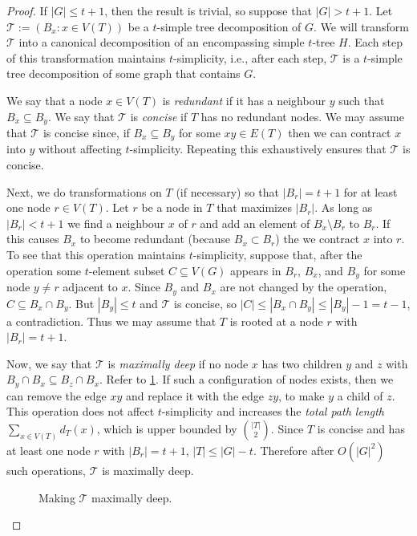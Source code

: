 \documentclass[kpfonts]{patmorin}
\theoremstyle{named}
\begin{document}
\begin{proof}
    If $|G|\le t+1$, then the result is trivial, so suppose that $|G|>t+1$. Let $\mathcal{T}:=(B_x:x\in V(T))$ be a $t$-simple tree decomposition of $G$. We will transform $\mathcal{T}$ into a canonical decomposition of an encompassing simple $t$-tree $H$. Each step of this transformation maintains $t$-simplicity, i.e., after each step, $\mathcal{T}$ is a $t$-simple tree decomposition of some graph that contains $G$.

    We say that a node $x\in V(T)$ is \emph{redundant} if it has a neighbour $y$ such that $B_x\subseteq B_y$.  We say that $\mathcal{T}$ is \emph{concise} if $T$ has no redundant nodes.  We may assume that $\mathcal{T}$ is concise since,  if $B_x\subseteq B_y$ for some $xy\in E(T)$ then we can contract $x$ into $y$ without affecting $t$-simplicity.  Repeating this exhaustively ensures that $\mathcal{T}$ is concise.

    Next, we do transformations on $T$ (if necessary) so that $|B_r|=t+1$ for at least one node $r\in V(T)$. Let $r$ be a node in $T$ that maximizes $|B_r|$. As long as $|B_r|<t+1$ we find a neighbour $x$ of $r$ and add an element of $B_x\setminus B_r$ to $B_r$.  If this causes $B_x$ to become redundant (because $B_x\subset B_r$) the we contract $x$ into $r$.  To see that this operation maintains $t$-simplicity, suppose that, after the operation some $t$-element subset $C\subseteq V(G)$ appears in $B_r$, $B_x$, and $B_y$ for some node $y\neq r$ adjacent to $x$.  Since $B_y$ and $B_x$ are not changed by the operation, $C\subseteq B_x\cap B_y$.  But $|B_y|\le t$ and $\mathcal{T}$ is concise, so $|C|\le|B_x\cap B_y|\le|B_y|-1= t-1$, a contradiction. Thus we may assume that $T$ is rooted at a node $r$ with $|B_r|=t+1$.

    Now, we say that $\mathcal{T}$ is \emph{maximally deep} if no node $x$ has two children $y$ and $z$ with $B_y\cap B_x\subseteq B_z\cap B_x$.  Refer to \cref{maximal}.  If such a configuration of nodes exists, then we can remove the edge $xy$ and replace it with the edge $zy$, to make $y$ a child of $z$.  This operation does not affect $t$-simplicity and increases the \emph{total path length} $\sum_{x\in V(T)} d_T(x)$, which is upper bounded by $\binom{|T|}{2}$.  Since $T$ is concise and has at least one node $r$ with $|B_r|=t+1$, $|T|\le |G|-t$.  Therefore after $O(|G|^2)$ such operations, $\mathcal{T}$ is maximally deep.

    \begin{figure}
        \caption{Making $\mathcal{T}$ maximally deep.}
        \label{maximal}
    \end{figure}


\end{proof}
\end{document}
